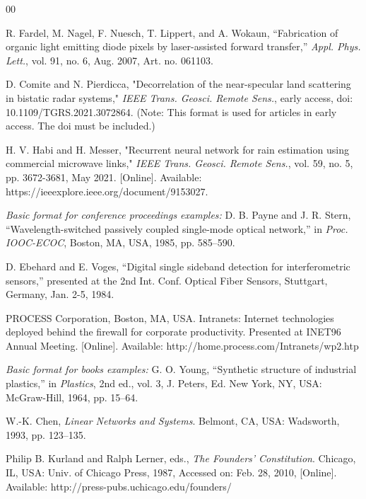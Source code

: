 \documentclass{infotel}
\begin{document}
\begin{thebibliography}{00}

 R. Fardel, M. Nagel, F. Nuesch, T. Lippert, and A. Wokaun, “Fabrication of organic light emitting diode pixels by laser-assisted forward transfer,” \textit{Appl. Phys. Lett.}, vol. 91, no. 6, Aug. 2007, Art. no. 061103. 

 D. Comite and N. Pierdicca, "Decorrelation of the near-specular land scattering in bistatic radar systems," \textit{IEEE Trans. Geosci. Remote Sens.}, early access, doi: 10.1109/TGRS.2021.3072864. (Note: This format is used for articles in early access. The doi must be included.)

 H. V. Habi and H. Messer, "Recurrent neural network for rain estimation using commercial microwave links," \textit{IEEE Trans. Geosci. Remote Sens.}, vol. 59, no. 5, pp. 3672-3681, May 2021. [Online]. Available: https://ieeexplore.ieee.org/document/9153027.


\textit{Basic format for conference proceedings examples:}
 D. B. Payne and J. R. Stern, “Wavelength-switched passively coupled single-mode optical network,” in \textit{Proc. IOOC-ECOC}, Boston, MA, USA, 1985, pp. 585–590.

 D. Ebehard and E. Voges, “Digital single sideband detection for interferometric sensors,” presented at the 2nd Int. Conf. Optical Fiber Sensors, Stuttgart, Germany, Jan. 2-5, 1984.

 PROCESS Corporation, Boston, MA, USA. Intranets: Internet technologies deployed behind the firewall for corporate productivity. Presented at INET96 Annual Meeting. [Online]. Available:  http://home.process.com/Intranets/wp2.htp


\textit{Basic format for books examples:}
 G. O. Young, “Synthetic structure of industrial plastics,” in \textit{Plastics}, 2nd ed., vol. 3, J. Peters, Ed. New York, NY, USA: McGraw-Hill, 1964, pp. 15–64.

 W.-K. Chen, \textit{Linear Networks and Systems}. Belmont, CA, USA: Wadsworth, 1993, pp. 123–135.

 Philip B. Kurland and Ralph Lerner, eds., \textit{The Founders’ Constitution}. Chicago, IL, USA: Univ. of Chicago Press, 1987, Accessed on: Feb. 28, 2010, [Online]. Available: http://press-pubs.uchicago.edu/founders/ 

\end{thebibliography}
\end{document}
